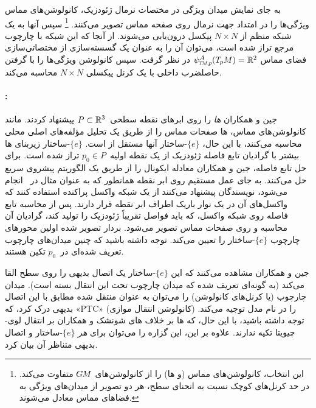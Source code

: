 به جای نمایش میدان ویژگی در مختصات نرمال ژئودزیک، کانولوشن‌های مماس ویژگی‌ها را در امتداد جهت نرمال روی صفحه مماس تصویر می‌کنند.%
\footnote{
    این انتخاب، کانولوشن‌های مماس (و ها) را از کانولوشن‌های $G\mkern-1.4muM$ متفاوت می‌کند.
    در حد کرنل‌های کوچک نسبت به انحنای سطح، هر دو تصویر از میدان‌های ویژگی به فضاهای مماس معادل می‌شوند.
}
سپس آنها به یک شبکه منظم از ${N\times N}$ پیکسل درون‌یابی می‌شوند.
از آنجا که این شبکه با چارچوب مرجع تراز شده است، می‌توان آن را به عنوان یک گسسته‌سازی از مختصاتی‌سازی فضای مماس $\psiTMp^A(\TpM) = \R^2$ در نظر گرفت.
سپس کانولوشن ویژگی‌ها را با گرفتن حاصلضرب داخلی با یک کرنل پیکسلی ${N\times N}$ محاسبه می‌کند.





\paragraph{:}
جین و همکاران \cite{jin2019NPTCnet} \emph{ها} را روی ابرهای نقطه سطحی~${P\subset\mathbb{R}^3}$ پیشنهاد کردند.
مانند کانولوشن‌های مماس، ها صفحات مماس را از طریق یک تحلیل مؤلفه‌های اصلی محلی محاسبه می‌کنند،
با این حال، $\{e\}$-ساختار آنها مستقل از  است.
$\{e\}$-ساختار زیربنای ها بیشتر با گرادیان تابع فاصله ژئودزیک از یک نقطه اولیه~$p_0 \in P$ تراز شده است.
برای حل تابع فاصله، جین و همکاران \cite{jin2019NPTCnet} معادله ایکونال را از طریق یک الگوریتم پیشروی سریع حل می‌کنند.
به جای عمل مستقیم روی ابر نقطه همانطور که به عنوان مثال در~\cite{Crane2017HeatMethodDistance} انجام می‌شود، نویسندگان پیشنهاد می‌کنند از یک شبکه واکسل پراکنده استفاده کنند که واکسل‌های آن در یک نوار باریک اطراف ابر نقطه قرار دارند.
پس از محاسبه تابع فاصله روی شبکه واکسل، که باید فواصل تقریباً ژئودزیک را تولید کند، گرادیان آن محاسبه و روی صفحات مماس تصویر می‌شود.
بردار تصویر شده اولین محورهای چارچوب $\{e\}$-ساختار را تعیین می‌کند.
توجه داشته باشید که چنین میدان‌های چارچوب تعریف شده‌ای در~$p_0$ تکین هستند.

جین و همکاران \cite{jin2019NPTCnet} مشاهده می‌کنند که این $\{e\}$-ساختار یک اتصال بدیهی را روی سطح القا می‌کند (به گونه‌ای تعریف شده که میدان چارچوب تحت این انتقال بسته است).
میدان چارچوب (یا کرنل‌های کانولوشن) را می‌توان به عنوان منتقل شده مطابق با این اتصال بدیهی درک کرد، که «PTC» (کانولوشن انتقال موازی) را در نام مدل توجیه می‌کند.
توجه داشته باشید، با این حال، که ها بر خلاف های شونشک و همکاران \cite{schonsheck2018parallel} بر انتقال لوی-چیویتا تکیه ندارند.
علاوه بر این، این گزاره را می‌توان برای \emph{هر} $\{e\}$-ساختار و اتصال بدیهی متناظر آن بیان کرد.

